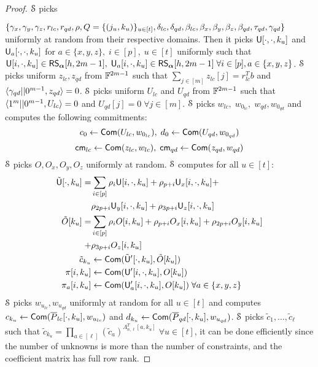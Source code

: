 \begin{proof}
	 $\mathcal{S}$ picks 
	
	$\{\gamma_x, \gamma_y, \gamma_z, r_{lc}, r_{qd}, \rho, Q=\{(j_u,k_u)\}_{u\in[t]}, \delta_{lc}, \delta_{qd}, \beta_{lc},\\ \beta_x, \beta_y, \beta_z, \beta_{qd}, \tau_{qd}, \gamma_{qd}\}$ uniformly at random from their respective domains. Then it picks $\mathsf{U}[\cdot,\cdot, k_u]$ and $\mathsf{U}_a[\cdot,\cdot,k_u]$ for $a\in\{x,y,z\}, \; i\in[p],\; u\in[t]$ uniformly such that $\mathsf{U}[i,\cdot, k_u] \in \mathsf{RS}_{\bm{\alpha}}[h,2m-1], \; \mathsf{U}_a[i,\cdot,k_u]\in \mathsf{RS}_{\bm{\alpha}}[h,2m-1]\; \forall i\in[p], a\in\{x,y,z\}$.
	$\mathcal{S}$ picks uniform $z_{lc}, z_{qd}$ from $\mathbb{F}^{2m-1}$ such that $\sum_{j\in[m]} z_{lc}[j] = r_{lc}^Tb$ and $\langle \gamma_{qd}||0^{m-1},z_{qd}\rangle = 0$.
	$\mathcal{S}$ picks uniform $U_{lc}$ and $U_{qd}$ from $\mathbb{F}^{2m-1}$ such that $\langle 1^m||0^{m-1},U_{lc}\rangle = 0$ and $U_{qd}[j]=0 \; \forall j\in[m]$. 
	$\mathcal{S}$ picks $w_{lc},\;w_{0_{lc}}, \;w_{qd},w_{0_{qd}}$ and computes the following commitments: 
	\[c_0\leftarrow \mathsf{Com}(U_{lc},w_{0_{lc}}), \; d_0\leftarrow \mathsf{Com}(U_{qd},w_{0_{qd}})\]
	\[\mathsf{cm}_{lc} \leftarrow \mathsf{Com}(z_{lc},w_{lc}), \; \mathsf{cm}_{qd} \leftarrow \mathsf{Com}(z_{qd},w_{qd})\]
	$\mathcal{S}$ picks $O, O_x, O_y, O_z$ uniformly at random. $\mathcal{S}$ computes for all $u\in[t]$:
	\begin{align*}
	\tilde{\mathsf{U}}[\cdot,k_u] = &\sum_{i\in[p]} \rho_i\mathsf{U}[i,\cdot, k_u]+ \rho_{p+i} \mathsf{U}_x[i,\cdot,k_u] +\\ &\rho_{2p+i} \mathsf{U}_y[i,\cdot,k_u] + \rho_{3p+i} \mathsf{U}_z[i,\cdot,k_u]\\
	\tilde{O}[k_u] = &\sum_{i\in[p]} \rho_i O[i, k_u]+ \rho_{p+i} O_x[i,k_u] + \rho_{2p+i} O_y[i,k_u]\\ + &\rho_{3p+i} O_z[i,k_u]\\
	\tilde{c}_{k_u} &\leftarrow \mathsf{Com}(\tilde{\mathsf{U}}'[\cdot,k_u], \tilde{O}[k_u])\\
	\pi[i,k_u] &\leftarrow \mathsf{Com}(\mathsf{U}'[i,\cdot,k_u], O[k_u])\\
	\pi_a[i,k_u] &\leftarrow \mathsf{Com}(\mathsf{U}_a'[i,\cdot,k_u], O[k_u])\; \forall a\in\{x,y,z\}
	\end{align*}
	$\mathcal{S}$ picks $w_{u_{lc}}, w_{u_{qd}}$ uniformly at random for all $u\in[t]$ and computes $c_{k_u}\leftarrow \mathsf{Com}(\overline{P}_{lc}[\cdot, k_u], w_{u_{lc}})$ and $d_{k_u}\leftarrow \mathsf{Com}(\overline{P}_{qd}[\cdot, k_u], w_{u_{qd}})$.
	$\mathcal{S}$ picks $\tilde{c}_1,\ldots,\tilde{c}_{\ell}$ such that $\tilde{c}_{k_u} = \prod_{a\in [\ell]} (\tilde{c}_a)^{\Lambda_{n,\ell}^T[a,k_u]}\; \forall u\in[t]$, it can be done efficiently since the number of unknowns is more than the number of constraints, and the coefficient matrix has full row rank.

\end{proof}
